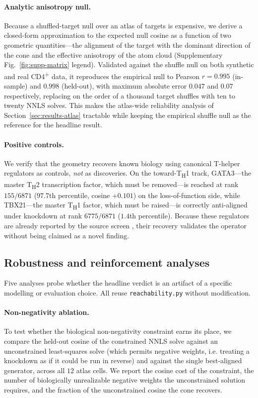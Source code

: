 \paragraph{Analytic anisotropy null.} Because a shuffled-target null over an atlas of targets
is expensive, we derive a closed-form approximation to the expected null cosine as a function
of two geometric quantities---the alignment of the target with the dominant direction of the
cone and the effective anisotropy of the atom cloud (Supplementary
Fig.~\ref{fig:supp-matrix} legend). Validated against the shuffle null on both synthetic and
real CD4\textsuperscript{+} data, it reproduces the empirical null to Pearson $r=0.995$
(in-sample) and $0.998$ (held-out), with maximum absolute error $0.047$ and $0.07$
respectively, replacing on the order of a thousand target shuffles with ten to twenty NNLS
solves. This makes the atlas-wide reliability analysis of Section~\ref{sec:results-atlas}
tractable while keeping the empirical shuffle null as the reference for the headline result.

\paragraph{Positive controls.} We verify that the geometry recovers known biology using
canonical T-helper regulators as controls, \emph{not} as discoveries. On the
toward-T\textsubscript{H}1 track, GATA3---the master T\textsubscript{H}2 transcription factor,
which must be removed---is reached at rank $155/6871$ ($97.7$th percentile, cosine $+0.101$)
on the loss-of-function side, while TBX21---the master T\textsubscript{H}1 factor, which must
be raised---is correctly anti-aligned under knockdown at rank $6775/6871$ ($1.4$th
percentile). Because these regulators are already reported by the source screen
\citep{Zhu2025}, their recovery validates the operator without being claimed as a novel
finding.

\subsection{Robustness and reinforcement analyses}
\label{sec:methods-robustness}
Five analyses probe whether the headline verdict is an artifact of a specific modelling or
evaluation choice. All reuse \texttt{reachability.py} without modification.

\paragraph{Non-negativity ablation.} To test whether the biological non-negativity constraint
earns its place, we compare the held-out cosine of the constrained NNLS solve against an
unconstrained least-squares solve (which permits negative weights, i.e. treating a knockdown
as if it could be run in reverse) and against the single best-aligned generator, across all
$12$ atlas cells. We report the cosine cost of the constraint, the number of biologically
unrealizable negative weights the unconstrained solution requires, and the fraction of the
unconstrained cosine the cone recovers.

